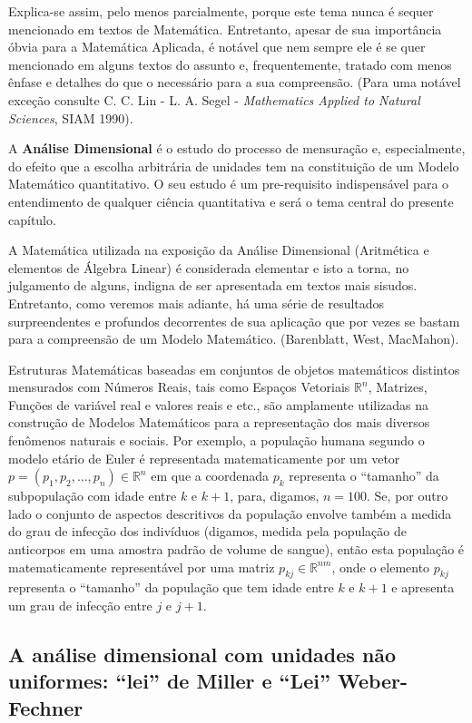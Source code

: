     Explica-se assim, pelo menos parcialmente, porque este tema nunca é sequer mencionado em textos de Matemática. Entretanto, apesar de sua importância óbvia para a Matemática Aplicada, é notável que nem sempre ele é se quer mencionado em alguns textos do assunto e, frequentemente, tratado com menos ênfase e detalhes do que o necessário para a sua compreensão. (Para uma notável exceção consulte C. C. Lin - L. A. Segel - \textit{Mathematics Applied to Natural Sciences}, SIAM 1990).

    A \textbf{Análise Dimensional} é o estudo do processo de mensuração e, especialmente, do efeito que a escolha arbitrária de unidades tem na constituição de um Modelo Matemático quantitativo. O seu estudo é um pre-requisito indispensável para o entendimento de qualquer ciência quantitativa e será o tema central do presente capítulo.

    A Matemática utilizada na exposição da Análise Dimensional (Aritmética e elementos de Álgebra Linear) é considerada elementar e isto a torna, no julgamento de alguns, indigna de ser apresentada em textos mais sisudos. Entretanto, como veremos mais adiante, há uma série de resultados surpreendentes e profundos decorrentes de sua aplicação que por vezes se bastam para a compreensão de um Modelo Matemático. (Barenblatt, West, MacMahon).

    Estruturas Matemáticas baseadas em conjuntos de objetos matemáticos distintos mensurados com Números Reais, tais como Espaços Vetoriais \(\mathbb{R}^n\), Matrizes, Funções de variável real e valores reais e etc., são amplamente utilizadas na construção de Modelos Matemáticos para a representação dos mais diversos fenômenos naturais e sociais. Por exemplo, a população humana segundo o modelo etário de Euler é representada matematicamente por um vetor \(p = (p_{1}, p_{2}, \ldots, p_{n}) \in \mathbb{R}^n\) em que a coordenada \(p_k\) representa o ``tamanho'' da subpopulação com idade entre \(k\) e \(k + 1\), para, digamos, \(n = 100\). Se, por outro lado o conjunto de aspectos descritivos da população envolve também a medida do grau de infecção dos indivíduos (digamos, medida pela população de anticorpos em uma amostra padrão de volume de sangue), então esta população é matematicamente representável por uma matriz \(p_{kj} \in \mathbb{R}^{nm}\), onde o elemento \(p_{kj}\) representa o ``tamanho'' da população que tem idade entre \(k\) e \(k + 1\) e apresenta um grau de infecção entre \(j\) e \(j + 1\).

\subsection{A análise dimensional com unidades não uniformes: ``lei'' de Miller e ``Lei'' Weber-Fechner}

